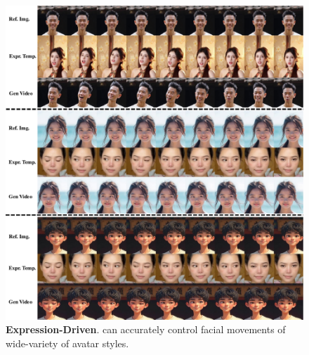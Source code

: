 \begin{figure}
    \centering
    \includegraphics[width=\linewidth]{applications/app_figures/expr-1.pdf}
    \caption{\textbf{Expression-Driven}. {\nameofmethod} can accurately control facial movements of wide-variety of avatar styles.}
    \label{fig:application-expr}
\end{figure}

